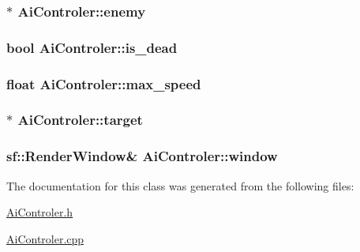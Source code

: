 \subsubsection[{enemy}]{$\ast$ Ai\+Controler\+::enemy\hspace{0.3cm}{\ttfamily [protected]}}\label{class_ai_controler_a71e4c6c84203c1b50b6e1d55b582db62}
\hypertarget{class_ai_controler_aaf7042b1051e301b6b356bc6d702dccd}{}
\subsubsection[{is\+\_\+dead}]{\setlength{\rightskip}{0pt plus 5cm}bool Ai\+Controler\+::is\+\_\+dead}\label{class_ai_controler_aaf7042b1051e301b6b356bc6d702dccd}
\hypertarget{class_ai_controler_ab541f013a1b6ba763ec1bc4c183816d0}{}
\subsubsection[{max\+\_\+speed}]{\setlength{\rightskip}{0pt plus 5cm}float Ai\+Controler\+::max\+\_\+speed\hspace{0.3cm}{\ttfamily [protected]}}\label{class_ai_controler_ab541f013a1b6ba763ec1bc4c183816d0}
\hypertarget{class_ai_controler_aa0130bc7fd057f94accf3aa3d542173b}{}
\subsubsection[{target}]{$\ast$ Ai\+Controler\+::target\hspace{0.3cm}{\ttfamily [protected]}}\label{class_ai_controler_aa0130bc7fd057f94accf3aa3d542173b}
\hypertarget{class_ai_controler_ac352e418d681e34fb822a1d70c84fb05}{}
\subsubsection[{window}]{\setlength{\rightskip}{0pt plus 5cm}sf\+::\+Render\+Window\& Ai\+Controler\+::window\hspace{0.3cm}{\ttfamily [protected]}}\label{class_ai_controler_ac352e418d681e34fb822a1d70c84fb05}


The documentation for this class was generated from the following files\+:\begin{DoxyCompactItemize}
\item 
\hyperlink{_ai_controler_8h}{Ai\+Controler.\+h}\item 
\hyperlink{_ai_controler_8cpp}{Ai\+Controler.\+cpp}\end{DoxyCompactItemize}
